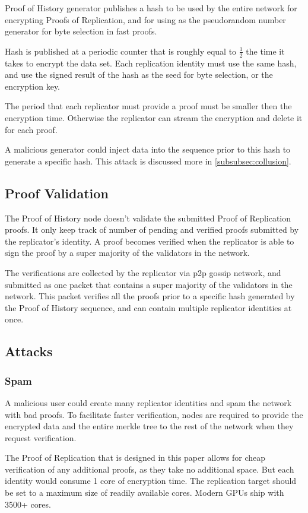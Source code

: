 \documentclass[12pt]{article}
\begin{document}
Proof of History generator publishes a hash to be used by the entire network for encrypting Proofs of Replication, and for using as the pseudorandom number generator for byte selection in fast proofs.

Hash is published at a periodic counter that is roughly equal to \(\frac{1}{2}\) the time it takes to encrypt the data set. Each replication identity must use the same hash, and use the signed result of the hash as the seed for byte selection, or the encryption key.

The period that each replicator must provide a proof must be smaller then the encryption time.  Otherwise the replicator can stream the encryption and delete it for each proof.

A malicious generator could inject data into the sequence prior to this hash to generate a specific hash. This attack is discussed more in \ref{subsubsec:collusion}.

\subsection{Proof Validation}
The Proof of History node doesn’t validate the submitted Proof of Replication proofs. It only keep track of number of pending and verified proofs submitted by the replicator's identity. A proof becomes verified when the replicator is able to sign the proof by a super majority of the validators in the network. 

The verifications are collected by the replicator via p2p gossip network, and submitted as one packet that contains a super majority of the validators in the network. This packet verifies all the proofs prior to a specific hash generated by the Proof of History sequence, and can contain multiple replicator identities at once.
\subsection{Attacks}
\subsubsection{Spam}
A malicious user could create many replicator identities and spam the network with bad proofs. To facilitate faster verification, nodes are required to provide the encrypted data and the entire merkle tree to the rest of the network when they request verification.

The Proof of Replication that is designed in this paper allows for cheap verification of any additional proofs, as they take no additional space. But each identity would consume 1 core of encryption time. The replication target should be set to a maximum size of readily available cores. Modern GPUs ship with 3500+ cores.
\end{document}
